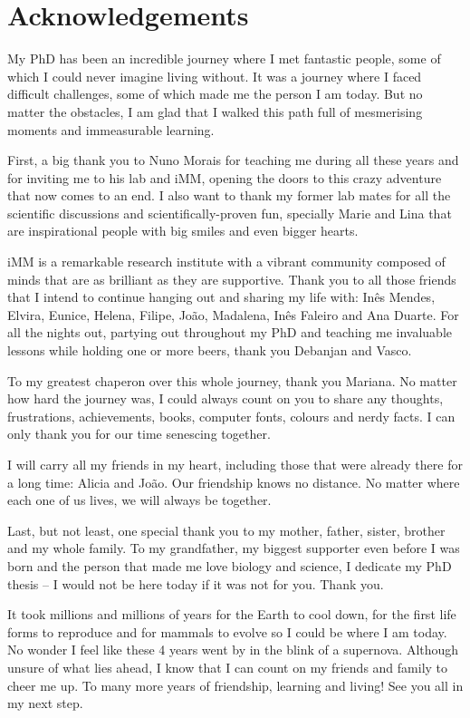 
\chapter*{Acknowledgements}

My PhD has been an incredible journey where I met fantastic people, some of which I could never imagine living without. It was a journey where I faced difficult challenges, some of which made me the person I am today. But no matter the obstacles, I am glad that I walked this path full of mesmerising moments and immeasurable learning.

First, a big thank you to Nuno Morais for teaching me during all these years and for inviting me to his lab and iMM, opening the doors to this crazy adventure that now comes to an end. I also want to thank my former lab mates for all the scientific discussions and scientifically-proven fun, specially Marie and Lina that are inspirational people with big smiles and even bigger hearts.

iMM is a remarkable research institute with a vibrant community composed of minds that are as brilliant as they are supportive. Thank you to all those friends that I intend to continue hanging out and sharing my life with: Inês Mendes, Elvira, Eunice, Helena, Filipe, João, Madalena, Inês Faleiro and Ana Duarte. For all the nights out, partying out throughout my PhD and teaching me invaluable lessons while holding one or more beers, thank you Debanjan and Vasco.

To my greatest chaperon over this whole journey, thank you Mariana. No matter how hard the journey was, I could always count on you to share any thoughts, frustrations, achievements, books, computer fonts, colours and nerdy facts. I can only thank you for our time senescing together.

I will carry all my friends in my heart, including those that were already there for a long time: Alicia and João. Our friendship knows no distance. No matter where each one of us lives, we will always be together.

Last, but not least, one special thank you to my mother, father, sister, brother and my whole family. To my grandfather, my biggest supporter even before I was born and the person that made me love biology and science, I dedicate my PhD thesis -- I would not be here today if it was not for you. Thank you.

It took millions and millions of years for the Earth to cool down, for the first life forms to reproduce and for mammals to evolve so I could be where I am today. No wonder I feel like these 4 years went by in the blink of a supernova. Although unsure of what lies ahead, I know that I can count on my friends and family to cheer me up. To many more years of friendship, learning and living! See you all in my next step.